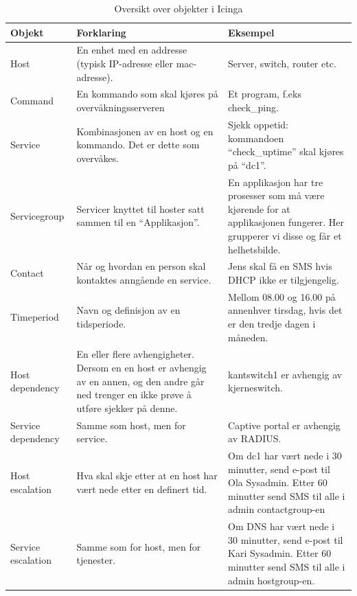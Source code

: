 \begin{changemargin}{-1cm}{-1cm}
\begin{table}
\begin{center}
\begin{tabular}{ | p{3.5cm} | p{6.5cm} | p{6cm} |} \hline
	\textbf{Objekt} & \textbf{Forklaring} & \textbf{Eksempel} \\ \hline
	Host & En enhet med en addresse (typisk IP-adresse eller mac-adresse). & Server, switch, router etc. \\ \hline
	Command & En kommando som skal kjøres på overvåkningsserveren & Et program, f.eks check\_ping. \\ \hline 
	Service & Kombinasjonen av en host og en kommando. Det er dette som overvåkes. & Sjekk oppetid: kommandoen “check\_uptime” skal kjøres på “dc1”. \\ \hline
	Servicegroup & Servicer knyttet til hoster satt sammen til en “Applikasjon”. & En applikasjon har tre prosesser som må være kjørende for at applikasjonen fungerer. Her grupperer vi disse og får et helhetsbilde. \\ \hline
	Contact & Når og hvordan en person skal kontaktes anngående en service. & Jens skal få en SMS hvis DHCP ikke er tilgjengelig. \\ \hline
	Timeperiod & Navn og definisjon av en tidsperiode. & Mellom 08.00 og 16.00 på annenhver tirsdag, hvis det er den tredje dagen i måneden. \\ \hline
	Host dependency & En eller flere avhengigheter. Dersom en en host er avhengig av en annen, og den andre går ned trenger en ikke prøve å utføre sjekker på denne. & kantswitch1 er avhengig av kjerneswitch. \\ \hline
	Service dependency & Samme som host, men for service. & Captive portal er avhengig av RADIUS. \\ \hline
	Host escalation & Hva skal skje etter at en host har vært nede etter en definert tid. &	Om dc1 har vært nede i 30 minutter, send e-post til Ola Sysadmin. Etter 60 minutter send SMS til alle i admin contactgroup-en \\ \hline
	Service escalation & Samme som for host, men for tjenester. & Om DNS har vært nede i 30 minutter, send e-post til Kari Sysadmin. Etter 60 minutter send SMS til alle i admin hostgroup-en. \\ \hline
	\end{tabular}
	\caption{Oversikt over objekter i Icinga}
	\label{objekter}
\end{center}
\end{table}
\end{changemargin}

